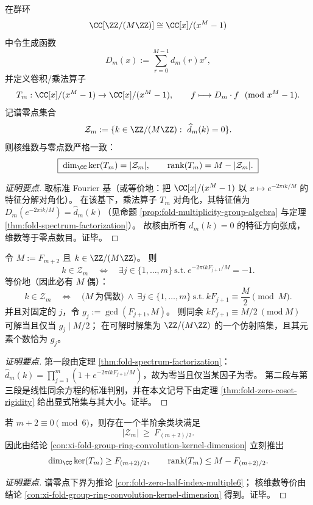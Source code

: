 \begin{conclusion}\label{con:xi-fold-group-ring-convolution-kernel-dimension}
在群环
\[
\CC[\ZZ/(M\ZZ)]\cong\CC[x]/(x^M-1)
\]
中令生成函数
\[
D_m(x):=\sum_{r=0}^{M-1}d_m(r)x^r,
\]
并定义卷积/乘法算子
\[
T_m:\CC[x]/(x^M-1)\to\CC[x]/(x^M-1),\qquad f\longmapsto D_m\cdot f\ \ (\mathrm{mod}\ x^M-1).
\]
记谱零点集合
\[
\mathcal Z_m:=\{k\in\ZZ/(M\ZZ):\ \widehat d_m(k)=0\}.
\]
则核维数与零点数严格一致：
\[
\boxed{\;
\dim_\CC\ker(T_m)=|\mathcal Z_m|,
\qquad
\mathrm{rank}(T_m)=M-|\mathcal Z_m|.\;}
\]
\end{conclusion}
\begin{proof}[证明要点]
取标准 Fourier 基（或等价地：把 \(\CC[x]/(x^M-1)\) 以 \(x\mapsto e^{-2\pi i k/M}\) 的特征分解对角化）。
在该基下，乘法算子 \(T_m\) 对角化，其特征值为
\(
D_m(e^{-2\pi i k/M})=\widehat d_m(k)
\)（见命题 \ref{prop:fold-multiplicity-group-algebra} 与定理 \ref{thm:fold-spectrum-factorization}）。
故核由所有 \(\widehat d_m(k)=0\) 的特征方向张成，维数等于零点数目。证毕。
\end{proof}

\begin{conclusion}[谱零点的同余方程刻画与余类分层]\label{con:xi-fold-spectrum-zero-congruence-coset-stratification}
令 \(M:=F_{m+2}\) 且 \(k\in\ZZ/(M\ZZ)\)。
则
\[
k\in\mathcal Z_m
\quad\Longleftrightarrow\quad
\exists j\in\{1,\dots,m\}\ \text{s.t.}\ e^{-2\pi i kF_{j+1}/M}=-1.
\]
等价地（因此必有 \(M\) 偶）：
\[
k\in\mathcal Z_m
\quad\Longleftrightarrow\quad
\bigl(M\ \text{为偶数}\bigr)\ \wedge\
\exists j\in\{1,\dots,m\}\ \text{s.t.}\ kF_{j+1}\equiv \frac{M}{2}\pmod M.
\]
并且对固定的 \(j\)，令 \(g_j:=\gcd(F_{j+1},M)\)。
则同余
\(
kF_{j+1}\equiv M/2\ (\mathrm{mod}\ M)
\)
可解当且仅当 \(g_j\mid M/2\)；
在可解时解集为 \(\ZZ/(M\ZZ)\) 的一个仿射陪集，且其元素个数恰为 \(g_j\)。
\end{conclusion}
\begin{proof}[证明要点]
第一段由定理 \ref{thm:fold-spectrum-factorization}：\(\widehat d_m(k)=\prod_{j=1}^m(1+e^{-2\pi i kF_{j+1}/M})\)，故为零当且仅当某因子为零。
第二段与第三段是线性同余方程的标准判别，并在本文记号下由定理 \ref{thm:fold-zero-coset-rigidity} 给出显式陪集与其大小。证毕。
\end{proof}

\begin{conclusion}[六倍窗的核维数下界与线性不可逆的半阶崩塌]\label{con:xi-fold-window6-kernel-half-index-lower-bound}
若 \(m+2\equiv 0\pmod 6\)，则存在一个半阶余类块满足
\[
|\mathcal Z_m|\ \ge\ F_{(m+2)/2}.
\]
因此由结论 \ref{con:xi-fold-group-ring-convolution-kernel-dimension} 立刻推出
\[
\dim_\CC\ker(T_m)\ge F_{(m+2)/2},
\qquad
\mathrm{rank}(T_m)\le M-F_{(m+2)/2}.
\]
\end{conclusion}
\begin{proof}[证明要点]
谱零点下界为推论 \ref{cor:fold-zero-half-index-multiple6}；
核维数等价由结论 \ref{con:xi-fold-group-ring-convolution-kernel-dimension} 得到。证毕。
\end{proof}

